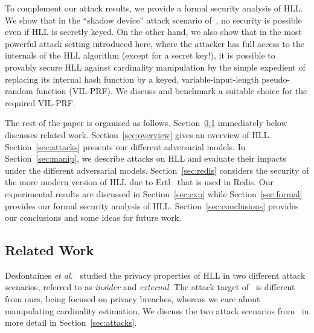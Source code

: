 \documentclass{article}
\begin{document}
To complement our attack results, we provide a formal security analysis of HLL. We show that in the ``shadow device'' attack scenario of~\cite{hllvuln}, no security is possible even if HLL is secretly keyed. On the other hand, we also show that in the most powerful attack setting introduced here, where the attacker has full access to the internals of the HLL algorithm (except for a secret key!), it is possible to provably secure HLL against cardinality manipulation by the simple expedient of replacing its internal hash function by a keyed, variable-input-length pseudo-random function (VIL-PRF). We discuss and benchmark a suitable choice for the required VIL-PRF.

The rest of the paper is organised as follows. Section~\ref{sec:related} immediately below discusses related work. Section~\ref{sec:overview} gives an overview of HLL. Section~\ref{sec:attacks} presents our different adversarial models. In Section~\ref{sec:manip}, we describe attacks on HLL and evaluate their impacts under the different adversarial models. Section~\ref{sec:redis} considers the security of the more modern version of HLL due to Ertl~\cite{hllnew} that is used in Redis. Our experimental results are discussed in Section~\ref{sec:exp} while Section~\ref{sec:formal} provides our formal security analysis of HLL. Section~\ref{sec:conclusions} provides our conclusions and some ideas for future work.

\subsection{Related Work}\label{sec:related}

Desfontaines \emph{et al.}~\cite{cardestprivacy} studied the privacy properties of HLL in two different attack scenarios, referred to as \emph{insider} and \emph{external}. The attack target of~\cite{cardestprivacy} is different from ours, being focused on privacy breaches, whereas we care about manipulating cardinality estimation. 
We discuss the two attack scenarios from~\cite{cardestprivacy} in more detail in Section~\ref{sec:attacks}.

\end{document}
